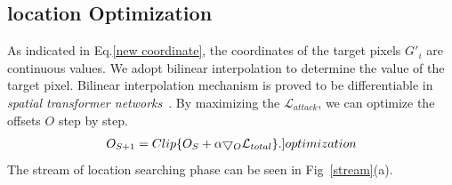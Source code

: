 \documentclass[10pt,twocolumn,letterpaper]{article}
\begin{document}
\subsection{location Optimization}
As indicated in Eq.\ref{new coordinate},
the coordinates of the target pixels $G'_i$ are continuous values. 
We adopt bilinear interpolation to determine the value of 
the target pixel. 
Bilinear interpolation mechanism is proved 
to be differentiable in 
\textit{spatial transformer networks}~\cite{stn}.
By maximizing the $\mathcal{L}_{attack}$, 
we can optimize the offsets $O$ step by step.
\begin{align}
	O_{S+1} = Clip 
	\{O_{S} + \alpha 
	{\bigtriangledown_{O}\mathcal{L}_{total}}\}. 
	\label[]{optimization}
\end{align}
The stream of location searching phase can be seen in 
Fig~\ref{stream}(a). 
\end{document}

